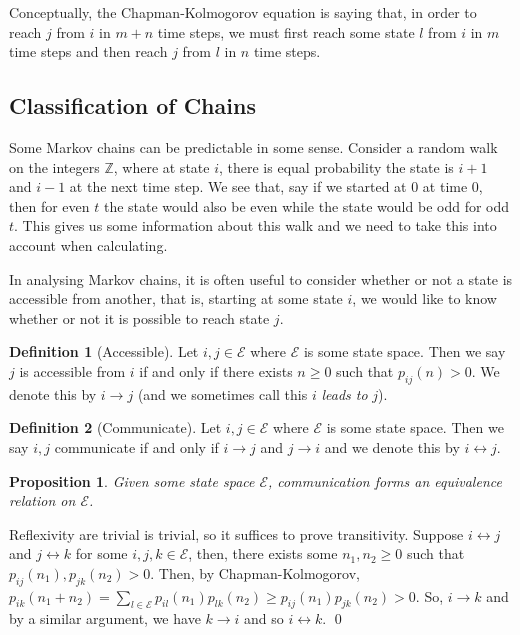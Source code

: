 \documentclass[
]{article}
\newtheorem{prop}{Proposition}[theorem]
\theoremstyle{definition}
\newtheorem{definition}{Definition}[section]
\begin{document}
Conceptually, the Chapman-Kolmogorov equation is saying that, in order
to reach \(j\) from \(i\) in \(m + n\) time steps, we must first reach
some state \(l\) from \(i\) in \(m\) time steps and then reach \(j\)
from \(l\) in \(n\) time steps.

\hypertarget{classification-of-chains}{%
\subsection{Classification of Chains}\label{classification-of-chains}}

Some Markov chains can be predictable in some sense. Consider a random
walk on the integers \(\mathbb{Z}\), where at state \(i\), there is
equal probability the state is \(i + 1\) and \(i - 1\) at the next time
step. We see that, say if we started at \(0\) at time \(0\), then for
even \(t\) the state would also be even while the state would be odd for
odd \(t\). This gives us some information about this walk and we need to
take this into account when calculating.

In analysing Markov chains, it is often useful to consider whether or
not a state is accessible from another, that is, starting at some state
\(i\), we would like to know whether or not it is possible to reach
state \(j\).

\begin{definition}[Accessible]
  Let \(i, j \in \mathcal{E}\) where \(\mathcal{E}\) is some state space. Then 
  we say \(j\) is accessible from \(i\) if and only if there exists \(n \ge 0\) 
  such that \(p_{ij}(n) > 0\). We denote this by \(i \to j\) (and we sometimes 
  call this \(i\) \textit{leads to} \(j\)).
\end{definition}

\begin{definition}[Communicate]
  Let \(i, j \in \mathcal{E}\) where \(\mathcal{E}\) is some state space. Then 
  we say \(i, j\) communicate if and only if \(i \to j\) and \(j \to i\) and 
  we denote this by \(i \leftrightarrow j\).
\end{definition}

\begin{prop}
  Given some state space \(\mathcal{E}\), communication forms an equivalence relation 
  on \(\mathcal{E}\).
\end{prop}
\proof

Reflexivity are trivial is trivial, so it suffices to prove
transitivity. Suppose \(i \leftrightarrow j\) and
\(j \leftrightarrow k\) for some \(i, j, k \in \mathcal{E}\), then,
there exists some \(n_1, n_2 \ge 0\) such that
\(p_{ij}(n_1), p_{jk}(n_2) > 0\). Then, by Chapman-Kolmogorov,
\(p_{ik}(n_1 + n_2) = \sum_{l \in \mathcal{E}} p_{il}(n_1) p_{lk}(n_2) \ge  p_{ij}(n_1)p_{jk}(n_2) > 0\).
So, \(i \to k\) and by a similar argument, we have \(k \to i\) and so
\(i \leftrightarrow k\). \qed
\end{document}
